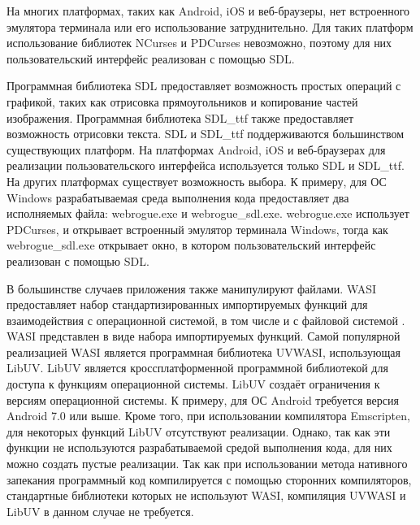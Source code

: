 На многих платформах, таких как Android, iOS и веб-браузеры, нет встроенного эмулятора терминала или его использование затруднительно.
Для таких платформ использование библиотек NCurses и PDCurses невозможно, поэтому для них пользовательский интерфейс реализован с помощью SDL.

Программная библиотека SDL предоставляет возможность простых операций с графикой, таких как отрисовка прямоугольников и копирование частей изображения.
Программная библиотека SDL\_ttf также предоставляет возможность отрисовки текста.
SDL и SDL\_ttf поддерживаются большинством существующих платформ.
На платформах Android, iOS и веб-браузерах для реализации пользовательского интерфейса используется только SDL и SDL\_ttf.
На других платформах существует возможность выбора. 
К примеру, для ОС Windows разрабатываемая среда выполнения кода предоставляет два исполняемых файла: webrogue.exe и webrogue\_sdl.exe.
webrogue.exe использует PDCurses, и открывает встроенный эмулятор терминала Windows, тогда как webrogue\_sdl.exe открывает окно, в котором пользовательский интерфейс реализован с помощью SDL.

В большинстве случаев приложения также манипулируют файлами.
WASI предоставляет набор стандартизированных импортируемых функций для взаимодействия с операционной системой, в том числе и с файловой системой \cite{WASI}.
WASI представлен в виде набора импортируемых функций.
Самой популярной реализацией WASI является программная библиотека UVWASI, использующая LibUV.
LibUV является кроссплатформенной программной библиотекой для доступа к функциям операционной системы.
LibUV создаёт ограничения к версиям операционной системы. 
К примеру, для ОС Android требуется версия Android 7.0 или выше.
Кроме того, при использовании компилятора Emscripten, для некоторых функций LibUV отсутствуют реализации.
Однако, так как эти функции не используются разрабатываемой средой выполнения кода, для них можно создать пустые реализации.
Так как при использовании метода нативного запекания программный код компилируется с помощью сторонних компиляторов, стандартные библиотеки которых не используют WASI, компиляция UVWASI и LibUV в данном случае не требуется.
